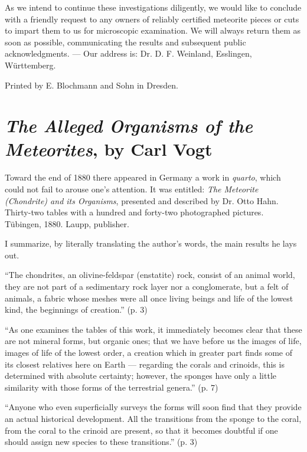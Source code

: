 \documentclass[a4paper, 12pt, oneside]{article}
\begin{document}
As we intend to continue these investigations diligently, we would like to conclude with a friendly request to any owners of reliably certified meteorite pieces or cuts to impart them to us for microscopic examination. We will always return them as soon as possible, communicating the results and subsequent public acknowledgments. --- Our address is: Dr. D. F. Weinland, Esslingen, Württemberg.

Printed by E. Blochmann and Sohn in Dresden.
\clearpage
\section{\emph{The Alleged Organisms of the Meteorites}, by Carl Vogt}
\paragraph*{}
Toward the end of 1880 there appeared in Germany a work in \emph{quarto}, which could not fail to arouse one's attention. It was entitled: \emph{The Meteorite (Chondrite) and its Organisms}, presented and described by Dr. Otto Hahn. Thirty-two tables with a hundred and forty-two photographed pictures. Tübingen, 1880. Laupp, publisher.

I summarize, by literally translating the author's words, the main results he lays out.

``The chondrites, an olivine-feldspar (enstatite) rock, consist of an animal world, they are not part of a sedimentary rock layer nor a conglomerate, but a felt of animals, a fabric whose meshes were all once living beings and life of the lowest kind, the beginnings of creation.'' (p. 3)

``As one examines the tables of this work, it immediately becomes clear that these are not mineral forms, but organic ones; that we have before us the images of life, images of life of the lowest order, a creation which in greater part finds some of its closest relatives here on Earth --- regarding the corals and crinoids, this is determined with absolute certainty; however, the sponges have only a little similarity with those forms of the terrestrial genera.'' (p. 7)

``Anyone who even superficially surveys the forms will soon find that they provide an actual historical development. All the transitions from the sponge to the coral, from the coral to the crinoid are present, so that it becomes doubtful if one should assign new species to these transitions.'' (p. 3)
\end{document}
